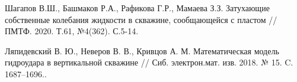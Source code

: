 



%

\begin{thebibliography}{9} %
 Шагапов В.Ш., Башмаков Р.А., Рафикова Г.Р., Мамаева З.З. Затухающие собственные колебания жидкости в скважине, сообщающейся с пластом // ПМТФ. 2020. Т.61, №4(362). С.5-14. 

	Ляпидевский В. Ю., Неверов В. В., Кривцов А. М. Математическая модель гидроудара в вертикальной скважине // Сиб. электрон.мат. изв. 2018. № 15. C. 1687–1696..


\end{thebibliography}





%